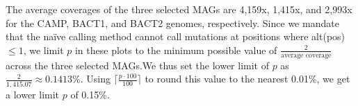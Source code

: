 The average coverages of the three selected MAGs are 4,159x, 1,415x, and 2,993x for the CAMP, BACT1, and BACT2 genomes, respectively. Since we mandate that the na\"ive calling method cannot call mutations at positions where alt(pos) $\leq 1$, we limit $p$ in these plots to the minimum possible value of $\frac{2}{\text{average coverage}}$ across the three selected MAGs.We thus set the lower limit of $p$ as $\frac{2}{1,415.07} \approx 0.1413\%$. Using $\bigg\lceil \frac{p \cdot 100}{100} \bigg\rceil$ to round this value to the nearest 0.01\%, we get a lower limit $p$ of 0.15\%.\endinput